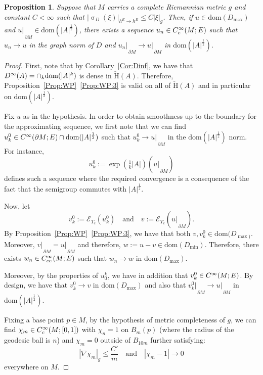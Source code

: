 \documentclass[a4paper,10pt,reqno]{amsart}
\newcommand{\sym}{\upsigma}
\newcommand{\rest}[1]{{{\lvert_{}}_{}}_{#1}}
\newcommand{\cbrac}[1]{\left(#1\right)}
\newcommand{\modulus}[1]{|#1|}
\newcommand{\Ck}[2][{}]{{\rm C}^{#2}_{\rm #1}}%
\newcommand{\Dk}[2][{}]{{\rm D}^{#2}_{\rm #1}}%
\newcommand{\checkH}{\check{\mathrm{H}}}
\newcommand{\dom}{\mathrm{dom}}
\newcommand{\ext}{\mathcal{E}}
\newcommand{\dM}{\partial M}
\newtheorem{proposition}[theorem]{Proposition}
\theoremstyle{definition}
\begin{document}
\begin{proposition}
\label{Prop:AEllRegApprox}
Suppose that $M$ carries a complete Riemannian metric $g$  and constant $C < \infty$ such that $\modulus{ \sym_{D}(\xi)}_{h^E \to h^E} \leq C \modulus{\xi}_{g}$.
Then, if $u \in \dom(D_{\max})$ and $u\rest{\dM} \in \dom(\modulus{A}^{\frac12})$, there exists a sequence $u_n \in \Ck[c]{\infty}(M;E)$ such that $u_n \to u$ in the graph norm of $D$ and $u_n\rest{\dM} \to u\rest{\dM}$ in $\dom(\modulus{A}^{\frac12})$.
\end{proposition}
\begin{proof}
First, note that by Corollary~\ref{Cor:Dinf}, we have that $\Dk{\infty}(A) = \cap_{k} \dom(\modulus{A}^k)$ is dense in $\checkH(A)$.
Therefore, Proposition~\ref{Prop:WP}~\ref{Prop:WP:3} is valid on all of $\checkH(A)$ and in particular on $\dom(\modulus{A}^{\frac12})$.

Fix $u$ as in the hypothesis.
In order to obtain smoothness up to the boundary for the approximating sequence, we first note that we can find $u^0_k \in \Ck{\infty}(\dM;E) \cap \dom(\modulus{A}^{\frac12})$ such that $u^0_k \to u\rest{\dM}$ in the $\dom(\modulus{A}^{\frac12})$ norm.
For instance,
$$u^0_k := \exp\cbrac{\tfrac{1}{k} \modulus{A}}(u\rest{\dM})$$
defines such a sequence where  the required convergence is a consequence of the fact that the semigroup commutes with $\modulus{A}^{\frac12}$.

Now, let
$$v^0_k := \ext_{T_c}(u^0_k)\quad\text{and}\quad v := \ext_{T_c}(u\rest{\dM}).$$
By Proposition~\ref{Prop:WP}~\ref{Prop:WP:3}, we have that both $v, v^0_k \in \dom(D_{\max)}$.
Moreover, $v\rest{\dM} = u \rest{\dM}$ and therefore, $w := u -v \in \dom(D_{\min})$.
Therefore, there exists $w_n \in \Ck[cc]{\infty}(M;E)$ such that $w_n \to w$ in $\dom(D_{\max})$.

Moreover, by the properties of $u_0^k$, we have in addition that $v^0_k \in \Ck{\infty}(M;E)$.
By design, we have that $v^0_k \to v$ in $\dom(D_{\max})$ and also that $v^0_k\rest{\dM} \to u\rest{\dM}$ in $\dom(\modulus{A}^{\frac12})$.

Fixing a base point $p \in M$, by the hypothesis of metric completeness of $g$, we can find $\chi_m \in \Ck[c]{\infty}(M;[0,1])$ with $\chi_n = 1$ on $B_{m}(p)$ (where the radius of the geodesic ball is $n$) and $\chi_m = 0$ outside of $B_{10m}$ further satisfying:
$$ \modulus{\nabla \chi_m}_{g} \leq \frac{C'}{m}\quad\text{and}\quad \modulus{\chi_m - 1} \to 0$$
everywhere on $M$.


\end{proof}
\end{document}
